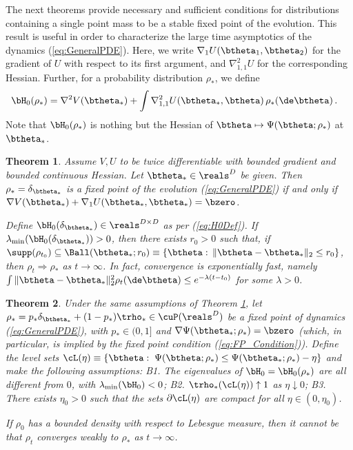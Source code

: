 \documentclass[11pt]{article}
\newtheorem{theorem}{Theorem}
\renewcommand{\eqref}[1]{(\ref{#1})}
\begin{document}
The next theorems provide necessary and sufficient conditions for distributions containing a single point mass to be a stable fixed point of the evolution.
This result is useful in order to characterize the large time asymptotics of the dynamics \eqref{eq:GeneralPDE}. 
Here, we write $\nabla_1U(\btheta_1,\btheta_2)$ for the gradient of $U$ with respect to its first argument, 
and $\nabla^2_{1,1}U$ for the corresponding Hessian. Further, for a probability distribution $\rho_*$, we define
%
\begin{align}
%
\bH_0(\rho_*) & = \nabla^2V(\btheta_*) +\int \nabla_{1,1}^2U(\btheta_*,\btheta)\, \rho_*(\de\btheta)\, . \label{eq:H0Def}
%
\end{align}
% 
Note that $\bH_0(\rho_*)$ is nothing but the Hessian of $\btheta\mapsto \Psi(\btheta;\rho_*)$ at $\btheta_*$.
%
\begin{theorem}\label{thm:StabilityDelta}
Assume $V, U$ to be twice differentiable with bounded gradient and bounded continuous Hessian.
Let $\btheta_*\in\reals^D$ be given. Then $\rho_*=\delta_{\btheta_*}$ is a fixed point of the evolution \eqref{eq:GeneralPDE} if and only if
$\nabla V(\btheta_*) +\nabla_1 U(\btheta_*,\btheta_*) = \bzero$.

Define  $\bH_0(\delta_{\btheta_*})\in\reals^{D\times D}$ as per \eqref{eq:H0Def}.
 If $\lambda_{\min}(\bH_0(\delta_{\btheta_*}))>0$, then there exists $r_0>0$ such that,
if $\supp(\rho_{t_0})\subseteq \Ball(\btheta_*;r_0)\equiv \{\btheta:\, \|\btheta-\btheta_*\|_2\le r_0\}$, then $\rho_t\Rightarrow \rho_*$
as $t\to\infty$. In fact, convergence is exponentially fast, namely $\int \|\btheta-\btheta_*\|_2^2\rho_t(\de\btheta)\le e^{-\lambda(t-t_0)}$
for some $\lambda>0$.
\end{theorem}
%
\begin{theorem}\label{thm:InstabilityDelta}
Under the same assumptions of Theorem \ref{thm:StabilityDelta}, let $\rho_* = p_*\delta_{\btheta_*}+(1-p_*)\trho_*\in \cuP(\reals^D)$ be a fixed point of dynamics \eqref{eq:GeneralPDE}, 
with $p_*\in (0,1]$ and $\nabla \Psi(\btheta_*;\rho_*) = \bzero$ (which, in particular, is implied by the fixed point condition \eqref{eq:FP_Condition}).
Define the level sets
$\cL(\eta) \equiv \{\btheta: \; \Psi(\btheta;\rho_*)\le \Psi(\btheta_*;\rho_*)-\eta\}$ and make the following assumptions:
{\sf B1.} The eigenvalues of $\bH_0=\bH_0(\rho_*)$ are all different from $0$, with $\lambda_{\min}(\bH_0)<0$;
{\sf B2.} $\trho_*(\cL(\eta))\uparrow 1$ as $\eta\downarrow 0$;
{\sf B3.} There exists 
$\eta_0>0$ such that the sets $\partial \cL(\eta)$ are compact for all $\eta\in(0,\eta_0)$.

 If $\rho_0$ has a bounded density
  with respect to Lebesgue measure, then it cannot be that $\rho_t$ converges weakly to $\rho_*$ as $t\to\infty$.
\end{theorem}
\end{document}
